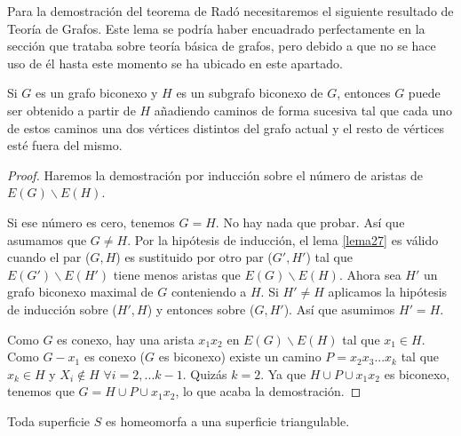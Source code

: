 Para la demostración del teorema de Radó necesitaremos el siguiente resultado de Teoría de Grafos.
Este lema se podría haber encuadrado perfectamente en la sección que trataba sobre teoría básica de grafos, pero debido a que no se hace uso de él hasta este momento se ha ubicado en este apartado.

\begin{lemma}\label{lema27}
	Si $G$ es un grafo biconexo y $H$ es un subgrafo biconexo de $G$, entonces $G$ puede ser obtenido a partir de $H$ añadiendo caminos de forma sucesiva tal que cada uno de estos caminos una dos vértices distintos del grafo actual y el resto de vértices esté fuera del mismo.
\end{lemma}

\begin{proof}
	Haremos la demostración por inducción sobre el número de aristas de $E(G) \backslash E(H)$.

	Si ese número es cero, tenemos $G = H$. No hay nada que probar. Así que  asumamos que $G \neq H$. Por la hipótesis de inducción, el lema \ref{lema27} es válido cuando el par ($G,H$) es sustituido por otro par ($G',H'$) tal que $E(G') \backslash E(H')$ tiene menos aristas que $E(G) \backslash E(H)$. Ahora sea $H'$ un grafo biconexo maximal  de $G$ conteniendo a $H$. Si $H' \neq H$ aplicamos la hipótesis de inducción sobre ($H',H$) y entonces sobre ($G,H'$). Así que asumimos $H' = H$.

	Como $G$ es conexo, hay una arista $x_{1}x_{2}$ en $E(G) \backslash E(H)$ tal que $x_{1} \in H$. Como $G - x_{1}$ es conexo ($G$ es biconexo) existe un camino $P = x_{2}x_{3}...x_{k}$ tal que $x_{k} \in H$ y $X_i \notin H$ $\forall i = 2,... k-1$. Quizás $k = 2$. Ya que $H \cup P \cup {x_{1}x_{2}}$ es biconexo, tenemos que $G = H \cup P \cup {x_{1}x_{2}}$, lo que acaba la demostración.
\end{proof}

\begin{theorem}
	Toda superficie $S$ es homeomorfa a una superficie triangulable.
\end{theorem}

